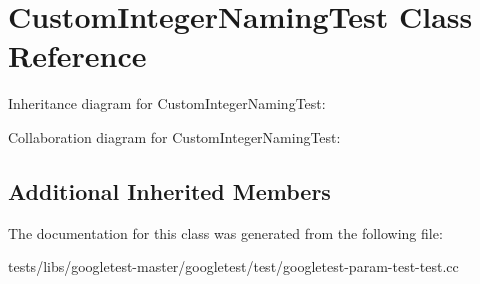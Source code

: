 \hypertarget{classCustomIntegerNamingTest}{}\section{Custom\+Integer\+Naming\+Test Class Reference}
\label{classCustomIntegerNamingTest}


Inheritance diagram for Custom\+Integer\+Naming\+Test\+:


Collaboration diagram for Custom\+Integer\+Naming\+Test\+:
\subsection*{Additional Inherited Members}


The documentation for this class was generated from the following file\+:\begin{DoxyCompactItemize}
\item 
tests/libs/googletest-\/master/googletest/test/googletest-\/param-\/test-\/test.\+cc\end{DoxyCompactItemize}
